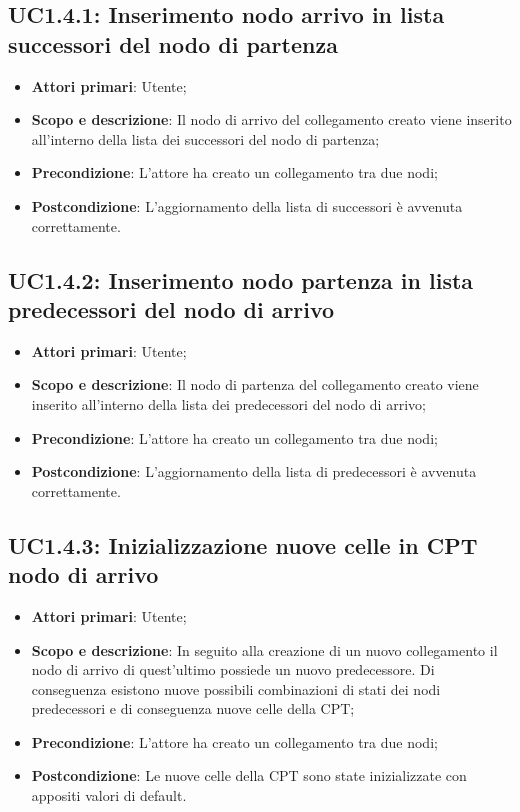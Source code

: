 \subsection{UC1.4.1: Inserimento nodo arrivo in lista successori del nodo di partenza} 
\hypertarget{UC1.4.1}{} 
\begin{itemize} 
	\item{\textbf{Attori primari}: Utente;} 
	\item{\textbf{Scopo e descrizione}: Il nodo di arrivo del collegamento creato viene inserito all'interno della lista dei successori del nodo di partenza;} 
	\item{\textbf{Precondizione}: L'attore ha creato un collegamento tra due nodi;} 
	\item{\textbf{Postcondizione}: L'aggiornamento della lista di successori è avvenuta correttamente.} 
\end{itemize} 
\subsection{UC1.4.2: Inserimento nodo partenza in lista predecessori del nodo di arrivo} 
\hypertarget{UC1.4.2}{} 
\begin{itemize} 
	\item{\textbf{Attori primari}: Utente;} 
	\item{\textbf{Scopo e descrizione}: Il nodo di partenza del collegamento creato viene inserito all'interno della lista dei predecessori del nodo di arrivo;} 
	\item{\textbf{Precondizione}: L'attore ha creato un collegamento tra due nodi;} 
	\item{\textbf{Postcondizione}: L'aggiornamento della lista di predecessori è avvenuta correttamente.} 
\end{itemize} 
\subsection{UC1.4.3: Inizializzazione nuove celle in CPT nodo di arrivo} 
\hypertarget{UC1.4.3}{} 
\begin{itemize} 
	\item{\textbf{Attori primari}: Utente;} 
	\item{\textbf{Scopo e descrizione}: In seguito alla creazione di un nuovo collegamento il nodo di arrivo di quest'ultimo possiede un nuovo predecessore. Di conseguenza esistono nuove possibili combinazioni di stati dei nodi predecessori e di conseguenza nuove celle della CPT;} 
	\item{\textbf{Precondizione}: L'attore ha creato un collegamento tra due nodi;} 
	\item{\textbf{Postcondizione}: Le nuove celle della CPT sono state inizializzate con appositi valori di default.} 
\end{itemize} 
